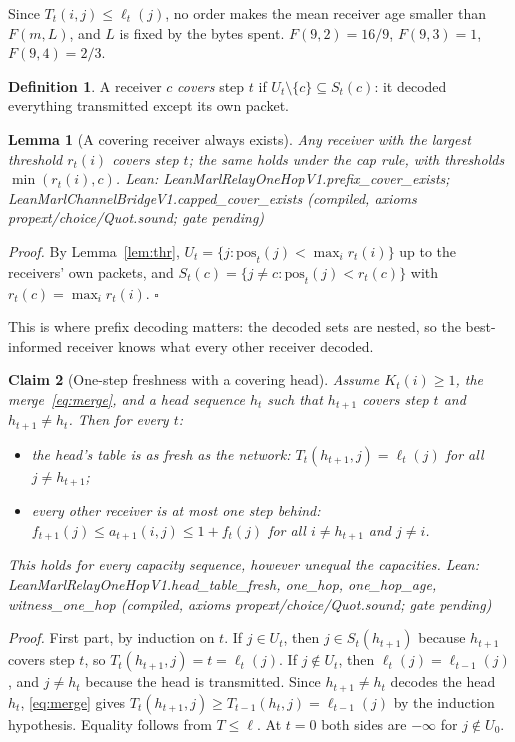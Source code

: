 \documentclass[11pt]{article}
\newtheorem{claim}{Claim}
\newtheorem{lemma}[claim]{Lemma}
\theoremstyle{definition}
\newtheorem{definition}{Definition}
\newcommand{\LEANC}[1]{\textsf{\footnotesize Lean: #1 (compiled, axioms propext/choice/Quot.sound; gate pending)}}
\begin{document}
Since $T_t(i,j)\le\ell_t(j)$, no order makes the mean receiver age smaller than $F(m,L)$, and $L$ is fixed by the bytes
spent. $F(9,2)=16/9$, $F(9,3)=1$, $F(9,4)=2/3$.

\begin{definition}\label{def:cover}
A receiver $c$ \emph{covers} step $t$ if $U_t\setminus\{c\}\subseteq S_t(c)$: it decoded everything transmitted except its
own packet.
\end{definition}
\begin{lemma}[A covering receiver always exists]\label{lem:cover}
Any receiver with the largest threshold $r_t(i)$ covers step $t$; the same holds under the cap rule, with thresholds
$\min(r_t(i),c)$. \LEANC{LeanMarlRelayOneHopV1.prefix\_cover\_exists; LeanMarlChannelBridgeV1.capped\_cover\_exists}
\end{lemma}
\emph{Proof.} By Lemma~\ref{lem:thr}, $U_t=\{j:\mathrm{pos}_t(j)<\max_ir_t(i)\}$ up to the receivers' own packets, and
$S_t(c)=\{j\ne c:\mathrm{pos}_t(j)<r_t(c)\}$ with $r_t(c)=\max_ir_t(i)$. $\square$

This is where prefix decoding matters: the decoded sets are nested, so the best-informed receiver knows what every other
receiver decoded.

\begin{claim}[One-step freshness with a covering head]\label{cl:onehop}
Assume $K_t(i)\ge1$, the merge~\eqref{eq:merge}, and a head sequence $h_t$ such that $h_{t+1}$ covers step $t$ and
$h_{t+1}\ne h_t$. Then for every $t$:
\begin{itemize}
\item the head's table is as fresh as the network: $T_t(h_{t+1},j)=\ell_t(j)$ for all $j\ne h_{t+1}$;
\item every other receiver is at most one step behind: $f_{t+1}(j)\le a_{t+1}(i,j)\le1+f_t(j)$ for all $i\ne h_{t+1}$ and
$j\ne i$.
\end{itemize}
This holds for every capacity sequence, however unequal the capacities. \LEANC{LeanMarlRelayOneHopV1.head\_table\_fresh,
one\_hop, one\_hop\_age, witness\_one\_hop}
\end{claim}
\emph{Proof.} First part, by induction on $t$. If $j\in U_t$, then $j\in S_t(h_{t+1})$ because $h_{t+1}$ covers step $t$, so
$T_t(h_{t+1},j)=t=\ell_t(j)$. If $j\notin U_t$, then $\ell_t(j)=\ell_{t-1}(j)$, and $j\ne h_t$ because the head is transmitted.
Since $h_{t+1}\ne h_t$ decodes the head $h_t$, \eqref{eq:merge} gives $T_t(h_{t+1},j)\ge T_{t-1}(h_t,j)=\ell_{t-1}(j)$ by the
induction hypothesis. Equality follows from $T\le\ell$. At $t=0$ both sides are $-\infty$ for $j\notin U_0$.
\end{document}
